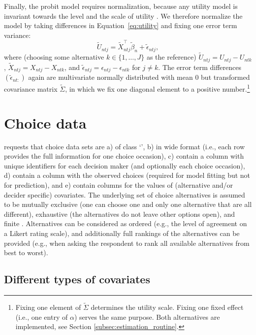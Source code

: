 \documentclass[article,shortnames]{jss}
\newcommand{\class}[1]{`\code{#1}'}
\begin{document}
Finally, the probit model requires normalization, because any utility model is invariant towards the level and the scale of utility \citep[Ch.\ 2]{Train:2009}. We therefore normalize the model by taking differences in Equation~\ref{eq:utility} and fixing one error term variance:
%
\begin{equation}
\label{eq:utility_diff}
\tilde{U}_{ntj} = \tilde{X}_{ntj}^\top \tilde{\beta}_n + \tilde{\epsilon}_{ntj},
\end{equation}
%
where (choosing some alternative $k \in \{1,\dots,J\}$ as the reference) $\tilde{U}_{ntj} = U_{ntj} - U_{ntk}$, $\tilde{X}_{ntj} = X_{ntj} - X_{ntk}$, and $\tilde{\epsilon}_{ntj} = \epsilon_{ntj} - \epsilon_{ntk}$ for $j\neq k$. The error term differences $(\tilde{\epsilon}_{nt:})$ again are multivariate normally distributed with mean 0 but transformed covariance matrix $\tilde{\Sigma}$, in which we fix one diagonal element to a positive number.\footnote{Fixing one element of $\tilde{\Sigma}$ determines the utility scale. Fixing one fixed effect (i.e., one entry of $\alpha$) serves the same purpose. Both alternatives are implemented, see Section \ref{subsec:estimation_routine}.}

\section{Choice data} \label{sec:choice_data}

 requests that choice data sets are a) of class \class{data.frame}, b) in wide format (i.e., each row provides the full information for one choice occasion), c) contain a column with unique identifiers for each decision maker (and optionally each choice occasion), d) contain a column with the observed choices (required for model fitting but not for prediction), and e) contain columns for the values of (alternative and/or decider specific) covariates. The underlying set of choice alternatives is assumed to be mutually exclusive (one can choose one and only one alternative that are all different), exhaustive (the alternatives do not leave other options open), and finite \citep[Ch.\ 2]{Train:2009}. Alternatives can be considered as ordered (e.g., the level of agreement on a Likert rating scale), and additionally full rankings of the alternatives can be provided (e.g., when asking the respondent to rank all available alternatives from best to worst).

\subsection{Different types of covariates} \label{subsec:covariate_types}
\end{document}
